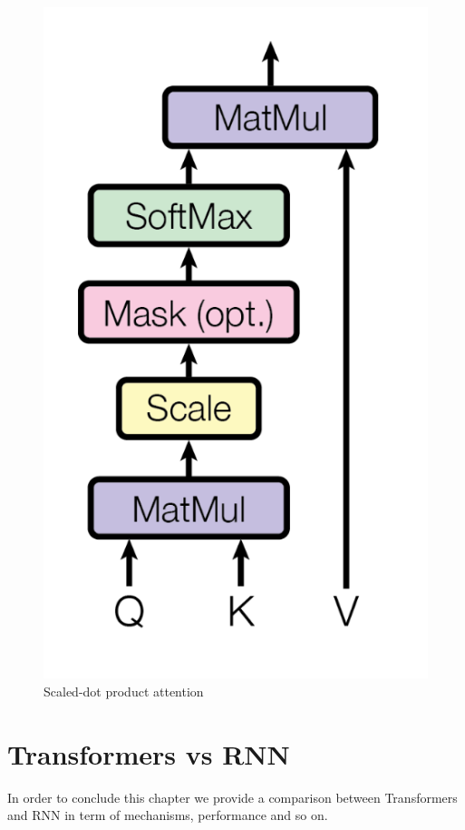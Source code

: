 \begin{multicols}{2}
    \begin{figure}[H]
        \centering
        \includegraphics[scale=0.5]{img/scaledDotProduct.png}
        \caption{Scaled-dot product attention}
    \end{figure}
\end{multicols}



\section{Transformers vs RNN}
In order to conclude this chapter we provide a comparison between Transformers and RNN in term of mechanisms, performance and so on. 


